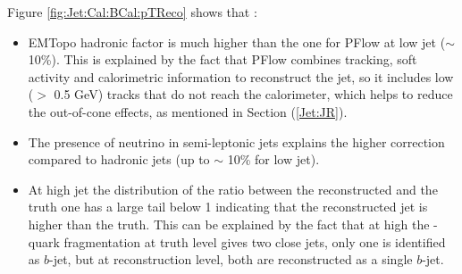 Figure \ref{fig:Jet:Cal:BCal:pTReco} shows that :
\begin{itemize}
    \item EMTopo hadronic factor is much higher than the one for PFlow at low jet \pT ($\sim$ 10\%). This is explained by the fact that PFlow combines tracking, soft activity and calorimetric information to reconstruct the jet, so it includes low \pT (\pT $>$ 0.5 GeV) tracks that do not reach the calorimeter, which helps to reduce the out-of-cone effects, as mentioned in Section (\ref{Jet:JR}). 
    \item The presence of neutrino in semi-leptonic jets explains the higher correction compared to hadronic jets (up to $\sim$ 10\% for low \pT jet).
    \item At high jet \pT the distribution of the ratio between the reconstructed \pT and the truth one has a large tail below 1 indicating that the reconstructed jet \pT is higher than the truth. This can be explained by the fact that at high \pT the \bq-quark fragmentation at truth level gives two close jets, only one is identified as $b$-jet, but at reconstruction level, both are reconstructed as a single $b$-jet.
\end{itemize}

